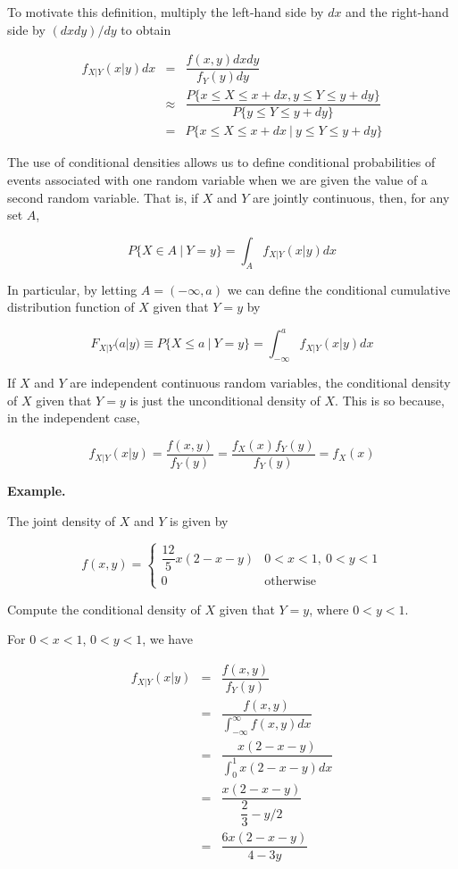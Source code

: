 To motivate this definition, multiply the left-hand side by $dx$ and the right-hand side by $(dxdy)/dy$ to obtain

\begin{eqnarray*}
	f_{X|Y}(x|y)dx &=& \dfrac{f(x,y)dxdy}{f_Y(y)dy} \\ 
	&\approx& \dfrac{P\{x \leq X \leq x + dx,y \leq Y \leq y + dy\}}{P \{y \leq Y \leq y + dy\}}\\
	&=& P\{x \leq X \leq x + dx~|~y \leq Y \leq y + dy\}
\end{eqnarray*}

The use of conditional densities allows us to define conditional probabilities of events associated with one random variable when we are given the value of a second random variable. That is, if $X$ and $Y$ are jointly continuous, then, for any set $A$,

$$P\{X \in A~|~ Y = y\} = \int_A f_{X|Y}(x|y)dx$$

In particular, by letting $A = (-\infty  ,a)$ we can define the conditional cumulative distribution function of $X$ given that $Y = y$ by

$$F_{X|Y}(a|y) \equiv P\{X \leq a ~|~ Y = y\} = \int^a_{-\infty} f_{X|Y}(x|y)dx$$

If $X$ and $Y$ are independent continuous random variables, the conditional density of $X$ given that $Y = y$ is just the unconditional density of $X$. This is so because, in the independent case,

$$f_{X|Y}(x|y) = \dfrac{f(x,y)}{f_Y(y)} = \dfrac{f_X(x)f_Y(y)}{f_Y(y)} = f_X(x)$$

\newpage

\textbf{Example.}

The joint density of $X$ and $Y$ is given by

$$f(x,y) = \begin{cases}
	\dfrac{12}{5}x(2 - x - y) & 0 < x < 1,~ 0 < y < 1\\
	0 & \text{otherwise}
\end{cases}$$

Compute the conditional density of $X$ given that $Y = y$, where $0 < y < 1$.

\begin{solution}
	For $0 < x < 1$, $0 < y < 1$, we have
	
	\begin{eqnarray*}
		f_{X|Y}(x|y) &=& \dfrac{f(x,y)}{f_Y(y)}\\
		&=& \dfrac{f(x,y)}{\int^{\infty}_{-\infty} f(x,y)dx}\\
		&=& \dfrac{x(2 - x - y)}{\int^1_0 x (2 - x - y)dx}\\
		&=& \dfrac{x(2 - x - y)}{\dfrac{2}{3} - y/2}\\
		&=& \dfrac{6x(2 - x - y)}{4 - 3y}
	\end{eqnarray*}
\end{solution}

